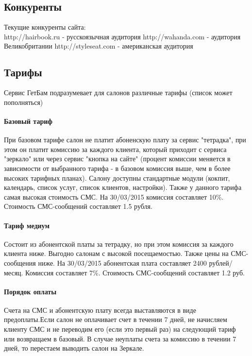 \documentclass[DIV=calc, paper=a4, fontsize=11pt]{scrartcl} %
\begin{document}
\subsection{Конкуренты}
Текущие конкуренты сайта:
\\[0.5cm]
http://hairbook.ru - русскоязычная аудитория
\newline http://wahanda.com - аудитория Великобритании
\newline http://styleseat.com - американская аудитория

\subsection{Тарифы} \label{subsec:tariffs}
Сервис ГетБам подразумевает для салонов различные тарифы (список может пополняться)

\paragraph{Базовый тариф}
При базовом тарифе салон не платит абоненскую плату за сервис "тетрадка", при этом он платит комиссию за каждого клиента, который приходит с сервиса "зеркало" или через сервис "кнопка на сайте" (процент комиссии меняется в зависимости от выбранного тарифа - в базовом комиссия выше, чем в более высоких тарифных планах). Салону доступны стандартные модули (кокпит, календарь, список услуг, список клиентов, настройки). Также у данного тарифа самая высокая стоимость СМС.
На 30/03/2015 комиссия составляет 10\%. Стоимость СМС-сообщений составляет 1.5 рубля.

\paragraph{Тариф медиум}
Состоит из абонентской платы за тетрадку, но при этом комиссия за каждого клиента ниже. Выгодно салонам с высокой посещаемостью. Также цены на СМС-сообщения ниже.
На 30/03/2015 абонентская плата составляет 2400 рублей/месяц. Комиссия составляет 7\%. Стоимость СМС-сообщений составляет 1.2 руб.

\paragraph{Порядок оплаты}
Счета на СМС и абонентскую плату всегда выставляются в виде предоплаты.Если салон не оплачивает счет в течении 7 дней, не начисляем клиенту СМС и не переводим его (если это первый раз) на следующий тариф или возвращаем в базовый.
В случае неуплаты счета за комиссию в течении 7 дней, то перестаем выводить салон на Зеркале.
\end{document}
